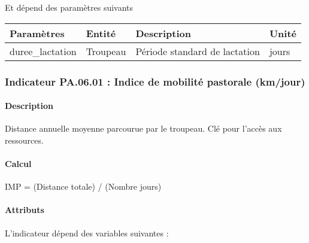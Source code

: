 \documentclass[
]{article}
\newenvironment{Shaded}{\begin{snugshade}}{\end{snugshade}}
\newcommand{\NormalTok}[1]{#1}
\begin{document}
Et dépend des paramètres suivants

\begin{longtable}[]{@{}llll@{}}
\toprule\noalign{}
\textbf{Paramètres} & \textbf{Entité} & \textbf{Description} &
\textbf{Unité} \\
\midrule\noalign{}
\endhead
\bottomrule\noalign{}
\endlastfoot
duree\_lactation & Troupeau & Période standard de lactation & jours \\
\end{longtable}

\subsubsection{Indicateur PA.06.01 : Indice de mobilité pastorale
(km/jour)}\label{indicateur-pa.06.01-indice-de-mobilituxe9-pastorale-kmjour}

\paragraph{Description}\label{description-5}

Distance annuelle moyenne parcourue par le troupeau. Clé pour l'accès
aux ressources.

\paragraph{Calcul}\label{calcul-5}

\begin{Shaded}
\begin{Highlighting}[]
\NormalTok{IMP = (Distance totale) / (Nombre jours)}
\end{Highlighting}
\end{Shaded}

\paragraph{Attributs}\label{attributs-23}

L'indicateur dépend des variables suivantes :
\end{document}
